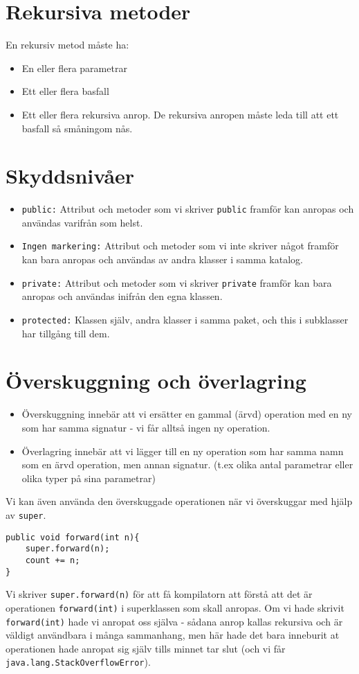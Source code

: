 \documentclass[11pt]{article}
\begin{document}
\section{Rekursiva metoder}
En rekursiv metod måste ha:
\begin{itemize}
\item{En eller flera parametrar}
\item{Ett eller flera basfall}
\item{Ett eller flera rekursiva anrop. De rekursiva anropen måste leda till att ett basfall så småningom nås. }
\end{itemize}

\section{Skyddsnivåer}
\begin{itemize}
\item{ \verb+public:+ Attribut och metoder som vi skriver \verb+public+ framför kan anropas och användas varifrån som helst. }
\item{ \verb+Ingen markering:+ Attribut och metoder som vi inte skriver något framför kan bara anropas och användas av andra klasser i samma katalog. }
\item{ \verb+private:+ Attribut och metoder som vi skriver \verb+private+ framför kan bara anropas och användas inifrån den egna klassen. }
\item{ \verb+protected:+ Klassen själv, andra klasser i samma paket, och this i subklasser har tillgång till dem.}
\end{itemize}
 
 
\section{Överskuggning och överlagring}
\begin{itemize}
\item{Överskuggning innebär att vi ersätter en gammal (ärvd) operation med en ny som har samma signatur - vi får alltså ingen ny operation. }
\item{ Överlagring innebär att vi lägger till en ny operation som har samma namn som en ärvd operation, men annan signatur. (t.ex olika antal parametrar eller olika typer på sina parametrar) }
\end{itemize}
Vi kan även använda den överskuggade operationen när vi överskuggar med hjälp av \verb+super+. 
\begin{lstlisting}
public void forward(int n){
	super.forward(n);
	count += n;
}
\end{lstlisting}
Vi skriver \verb+super.forward(n)+ för att få kompilatorn att förstå att det är operationen \verb+forward(int)+ i superklassen som skall anropas. Om vi hade skrivit \verb+forward(int)+ hade vi anropat oss själva - sådana anrop kallas rekursiva och är väldigt användbara i många sammanhang, men här hade det bara inneburit at operationen hade anropat sig själv tills minnet tar slut (och vi får \verb+java.lang.StackOverflowError+). 
\end{document}
